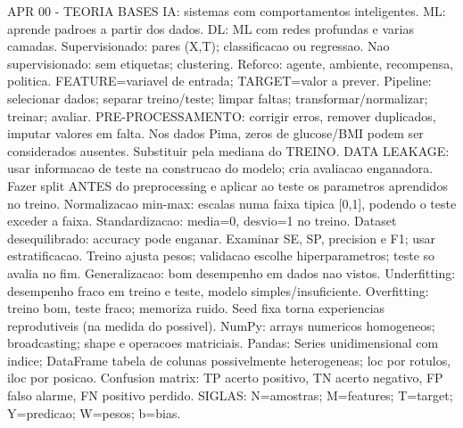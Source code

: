 APR 00 - TEORIA BASES
IA: sistemas com comportamentos inteligentes.
ML: aprende padroes a partir dos dados.
DL: ML com redes profundas e varias camadas.
Supervisionado: pares (X,T); classificacao ou regressao.
Nao supervisionado: sem etiquetas; clustering.
Reforco: agente, ambiente, recompensa, politica.
FEATURE=variavel de entrada; TARGET=valor a prever.
Pipeline: selecionar dados; separar treino/teste; limpar faltas; transformar/normalizar; treinar; avaliar.
PRE-PROCESSAMENTO: corrigir erros, remover duplicados, imputar valores em falta. Nos dados Pima, zeros de glucose/BMI podem ser considerados ausentes. Substituir pela mediana do TREINO.
DATA LEAKAGE: usar informacao de teste na construcao do modelo; cria avaliacao enganadora. Fazer split ANTES do preprocessing e aplicar ao teste os parametros aprendidos no treino.
Normalizacao min-max: escalas numa faixa tipica [0,1], podendo o teste exceder a faixa. Standardizacao: media=0, desvio=1 no treino.
Dataset desequilibrado: accuracy pode enganar. Examinar SE, SP, precision e F1; usar estratificacao.
Treino ajusta pesos; validacao escolhe hiperparametros; teste so avalia no fim.
Generalizacao: bom desempenho em dados nao vistos.
Underfitting: desempenho fraco em treino e teste, modelo simples/insuficiente.
Overfitting: treino bom, teste fraco; memoriza ruido.
Seed fixa torna experiencias reprodutiveis (na medida do possivel).
NumPy: arrays numericos homogeneos; broadcasting; shape e operacoes matriciais.
Pandas: Series unidimensional com indice; DataFrame tabela de colunas possivelmente heterogeneas; loc por rotulos, iloc por posicao.
Confusion matrix: TP acerto positivo, TN acerto negativo, FP falso alarme, FN positivo perdido.
SIGLAS: N=amostras; M=features; T=target; Y=predicao; W=pesos; b=bias.